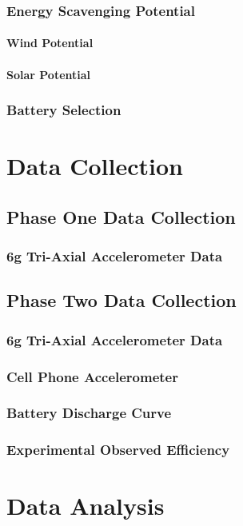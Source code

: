 \documentclass[12pt]{report}
\begin{document}
		\subsection{Energy Scavenging Potential}
			\subsubsection{Wind Potential}
			\subsubsection{Solar Potential}
		\subsection{Battery Selection}
		
\chapter{Data Collection}
	\section{Phase One Data Collection}
		\subsection{6g Tri-Axial Accelerometer Data}
	\section{Phase Two Data Collection}
		\subsection{6g Tri-Axial Accelerometer Data}
		\subsection{Cell Phone Accelerometer}
		\subsection{Battery Discharge Curve}
		\subsection{Experimental Observed Efficiency}
\chapter{Data Analysis}
\end{document}

